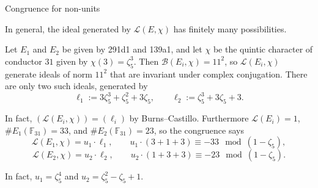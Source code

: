 \documentclass[10pt]{beamer}
\begin{document}
\begin{frame}[t]{Congruence for non-units}

In general, the ideal generated by $ \mathcal{L}(E, \chi) $ has finitely many possibilities.

\pause

\begin{example}
Let $ E_1 $ and $ E_2 $ be given by 291d1 and 139a1, and let $ \chi $ be the quintic character of conductor $ 31 $ given by $ \chi(3) = \zeta_5^3 $. \pause Then $ \mathcal{B}(E_i, \chi) = 11^2 $, so $ \mathcal{L}(E_i, \chi) $ generate ideals of norm $ 11^2 $ that are invariant under complex conjugation. \pause There are only two such ideals, generated by
$$ \ell_1 := 3\zeta_5^3 + \zeta_5^2 + 3\zeta_5, \qquad \ell_2 := \zeta_5^3 + 3\zeta_5 + 3. $$

\pause

In fact, $ (\mathcal{L}(E_i, \chi)) = (\ell_i) $ by Burns--Castillo. \pause Furthermore $ \mathcal{L}(E_i) = 1 $, $ \#E_1(\mathbb{F}_{31}) = 33 $, and $ \#E_2(\mathbb{F}_{31}) = 23 $, so the congruence says
$$ \mathcal{L}(E_1, \chi) = u_1 \cdot \ell_1, \qquad u_1 \cdot (3 + 1 + 3) \equiv -33 \mod (1 - \zeta_5), $$
$$ \mathcal{L}(E_2, \chi) = u_2 \cdot \ell_2, \qquad u_2 \cdot (1 + 3 + 3) \equiv -23 \mod (1 - \zeta_5). $$

\pause

In fact, $ u_1 = \zeta_5^4 $ and $ u_2 = \zeta_5^2 - \zeta_5 + 1 $.
\end{example}

\end{frame}
\end{document}
